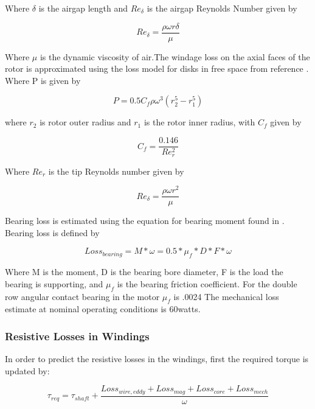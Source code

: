 \documentclass[]{aiaa-tc}%
\begin{document}
Where $\delta$ is the airgap length and $Re_{\delta}$ is the airgap Reynolds Number given by

\begin{equation}
Re_{\delta}=\frac{\rho\omega r \delta}{\mu}
\label{eq:Re_delta}
\end{equation}

Where $\mu$ is the dynamic viscosity of air.The windage loss on the axial faces of the rotor is approximated using the loss model for disks in free space from reference \cite{Saari}. Where P is given by 

\begin{equation}
P =0.5C_{f}\rho\omega^{3}(r_{2}^{5}-r_{1}^{5})
\label{eq:AxialWindage}
\end{equation}

where $r_{2}$ is rotor outer radius and $r_{1}$ is the rotor inner radius, with $C_{f}$ given by

\begin{equation}
C_{f}= \frac{0.146}{Re_{r}^{2}}
\label{eq:Cf2}
\end{equation}

Where $Re_{r}$ is the tip Reynolds number given by 

\begin{equation}
Re_{\delta}=\frac{\rho\omega r^{2}}{\mu}
\label{eq:Re2}
\end{equation}

Bearing loss is estimated using the equation for bearing moment found in \cite{Krings}. Bearing loss is defined by

\begin{equation}
Loss_{bearing} = M*\omega = 0.5*\mu_{f}*D*F*\omega
\label{eq:BearingLoss}
\end{equation}

Where M is the moment, D is the bearing bore diameter, F is the load the bearing is supporting, and $\mu_{f}$ is the bearing friction coefficient. For the double row angular contact bearing in the motor $\mu_{f}$ is .0024  The mechanical loss estimate at nominal operating conditions is 60watts.


\subsubsection{Resistive Losses in Windings}
In order to predict the resistive losses in the windings, first the required torque is updated by:

\begin{equation}
\tau_{req} = \tau_{shaft} + \frac{Loss_{wire,eddy} + Loss_{mag} +Loss_{core} +Loss_{mech}}{\omega}
\label{eq:TotalLoss}
\end{equation}
\end{document}
